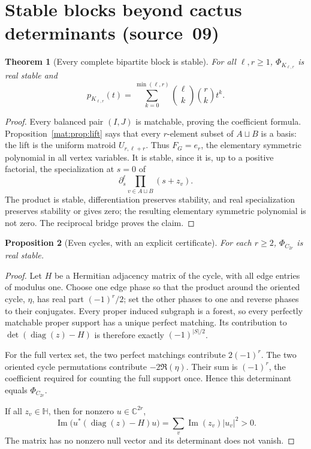 \documentclass[11pt]{article}
\numberwithin{equation}{section}
\newtheorem{theorem}{Theorem}[section]
\newtheorem{proposition}[theorem]{Proposition}
\theoremstyle{definition}
\newcommand{\C}{\mathbb C}
\newcommand{\HH}{\mathbb H}
\newcommand{\im}{\operatorname{Im}}
\begin{document}
\section{Stable blocks beyond cactus determinants (source~09)}
\label{ade:mat:sec:stable-families}
\begin{theorem}[Every complete bipartite block is stable]\label{ade:mat:thm:biclique}
For all $\ell,r\geq1$, $\Phi_{K_{\ell,r}}$ is real stable and
\begin{equation}
 p_{K_{\ell,r}}(t)=\sum_{k=0}^{\min(\ell,r)}
                              \binom\ell k\binom r k t^k.
\label{ade:mat:eq:biclique}
\end{equation}
\end{theorem}
\begin{proof}
Every balanced pair $(I,J)$ is matchable, proving the coefficient formula.
Proposition~\ref{mat:prop:lift} says that every $r$-element subset of
$A\sqcup B$ is a basis: the lift is the uniform matroid $U_{r,\ell+r}$.
Thus $F_G=e_r$, the elementary symmetric polynomial in all vertex variables.
It is stable, since it is, up to a positive factorial, the specialization
at $s=0$ of
\[
 \partial_s^{\ell}\prod_{v\in A\sqcup B}(s+z_v).
\]
The product is stable, differentiation preserves stability, and real
specialization preserves stability or gives zero; the resulting elementary
symmetric polynomial is not zero. The reciprocal bridge proves the claim.
\end{proof}

\begin{proposition}[Even cycles, with an explicit certificate]
\label{ade:mat:prop:cycles}
For each $r\geq2$, $\Phi_{C_{2r}}$ is real stable.
\end{proposition}
\begin{proof}
Let $H$ be a Hermitian adjacency matrix of the cycle, with all edge entries
of modulus one. Choose one edge phase so that the product around the
oriented cycle, $\eta$, has real part $(-1)^r/2$; set the other phases to
one and reverse phases to their conjugates. Every proper induced subgraph
is a forest, so every perfectly matchable proper support has a unique
perfect matching. Its contribution to $\det(\operatorname{diag}(z)-H)$ is
therefore exactly $(-1)^{|S|/2}$.

For the full vertex set, the two perfect matchings contribute $2(-1)^r$.
The two oriented cycle permutations contribute $-2\Re(\eta)$. Their sum
is $(-1)^r$, the coefficient required for counting the full support once.
Hence this determinant equals $\Phi_{C_{2r}}$.

If all $z_v\in\HH$, then for nonzero $u\in\C^{2r}$,
\[
 \im\bigl(u^*(\operatorname{diag}(z)-H)u\bigr)
       =\sum_v\im(z_v)|u_v|^2>0.
\]
The matrix has no nonzero null vector and its determinant does not vanish.
\end{proof}
\end{document}
